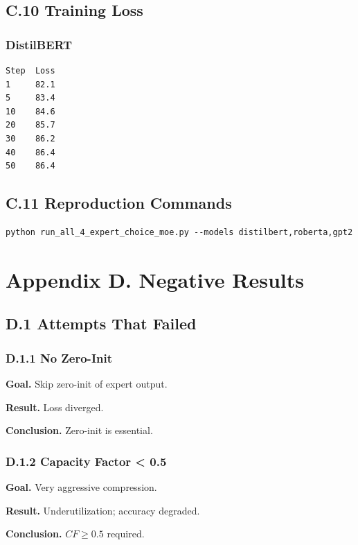 \subsection{C.10 Training Loss}

\subsubsection{DistilBERT}
\begin{lstlisting}
Step  Loss
1     82.1
5     83.4
10    84.6
20    85.7
30    86.2
40    86.4
50    86.4
\end{lstlisting}

\subsection{C.11 Reproduction Commands}

\begin{lstlisting}
python run_all_4_expert_choice_moe.py --models distilbert,roberta,gpt2
\end{lstlisting}



\section{Appendix D. Negative Results}

\subsection{D.1 Attempts That Failed}

\subsubsection{D.1.1 No Zero-Init}

\textbf{Goal.} Skip zero-init of expert output.

\textbf{Result.} Loss diverged.

\textbf{Conclusion.} Zero-init is essential.

\subsubsection{D.1.2 Capacity Factor < 0.5}

\textbf{Goal.} Very aggressive compression.

\textbf{Result.} Underutilization; accuracy degraded.

\textbf{Conclusion.} $CF \geq 0.5$ required.

